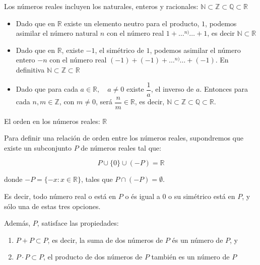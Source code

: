 \documentclass[ignorenonframetext,]{beamer}
\begin{document}
\begin{frame}{Los números reales incluyen los naturales, enteros y
racionales:
\(\mathbb{N} \subset \mathbb{Z} \subset \mathbb{Q} \subset \mathbb{R}\)}
\protect\hypertarget{los-nuxfameros-reales-incluyen-los-naturales-enteros-y-racionales-mathbbn-subset-mathbbz-subset-mathbbq-subset-mathbbr}{}

\begin{itemize}
\item
  Dado que en \(\mathbb{R}\) existe un elemento neutro para el producto,
  \(1\), podemos asimilar el número natural \(n\) con el número real
  \(1+ \ldots \overset{n)}{} \ldots + 1\), es decir
  \(\mathbb{N} \subset \mathbb{R}\)
\item
  Dado que en \(\mathbb{R}\), existe \(-1\), el simétrico de \(1\),
  podemos asimilar el número entero \(-n\) con el número real
  \((-1)+(-1)+ \ldots \overset{n)}{} \ldots +(-1)\). En definitiva
  \(\mathbb{N} \subset \mathbb{Z} \subset \mathbb{R}\)
\item
  Dado que para cada \(a \in \mathbb{R}, \quad a\neq 0\) existe
  \(\dfrac{1}{a}\), el inverso de \(a\). Entonces para cada
  \(n,m \in \mathbb{Z}\), con \(m \neq 0\), será
  \(\dfrac{n}{m} \in \mathbb{R}\), es decir,
  \(\mathbb{N} \subset \mathbb{Z} \subset \mathbb{Q} \subset \mathbb{R}\).
\end{itemize}

\end{frame}

\begin{frame}{El orden en los números reales: \(\mathbb{R}\)}
\protect\hypertarget{el-orden-en-los-nuxfameros-reales-mathbbr}{}

Para definir una relación de orden entre los números reales, supondremos
que existe un subconjunto \(P\) de números reales tal que:

\[
P \cup  \{ 0 \} \cup (-P) = \mathbb{R} 
\]

donde \(-P = \{-x: x \in \mathbb{R} \}\), tales que
\(P\cap (-P) = \emptyset\).

Es decir, todo número real o está en \(P\) o és igual a \(0\) o su
simétrico está en \(P\), y sólo una de estas tres opciones.

Además, \(P\), satisface las propiedades:

\begin{enumerate}
[(1)]
\item
  \(P+P \subset P\), es decir, la suma de dos números de \(P\) és un
  número de \(P\), y
\item
  \(P \cdot P \subset P\), el producto de dos números de \(P\) también
  es un número de \(P\)
\end{enumerate}

\end{frame}
\end{document}
